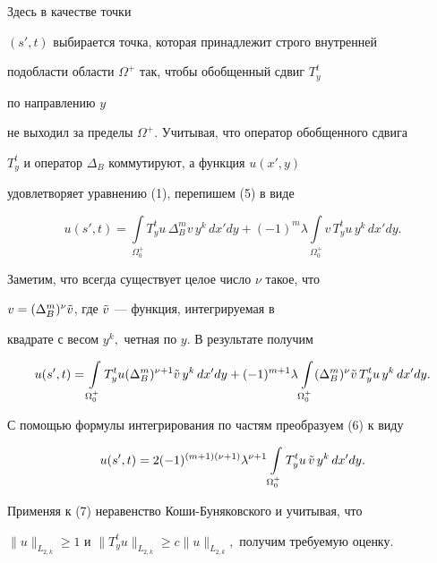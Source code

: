 Здесь в качестве точки


$(s',t)$ выбирается точка, которая принадлежит строго внутренней


подобласти области $\Omega^+$ так, чтобы обобщенный сдвиг $T^t_y$


по направлению $y$


не выходил за пределы $\Omega^+$. Учитывая, что оператор обобщенного сдвига


$T^t_y$ и оператор $\Delta_B$ коммутируют, а функция $u(x',y)$


удовлетворяет уравнению (1), перепишем (5) в виде


$$


u(s',t)=\int\limits_{\Omega^+_0}T^t_yu\,\Delta^m_Bv\,y^k\,dx'dy


+(-1)^m\lambda\int\limits_{\Omega^+_0}v\,T^t_yu\,y^k\,dx'dy.


$$





Заметим, что всегда существует целое число $\nu$ такое, что


$v=(\Delta^m_B)^\nu\Tilde v$, где $\Tilde v$ --- функция, интегрируемая в


квадрате с весом $y^k,$ четная по $y$. В результате получим


\begin{equation}


u(s',t)=\int\limits_{\Omega^+_0}T^t_yu(\Delta^m_B)^{\nu+1}\Tilde


v\,y^k\,dx'dy+(-1)^{m+1}\lambda\int\limits_{\Omega^+_0}(\Delta^m_B)^\nu


\Tilde v\,T^t_yu\,y^k\,dx'dy.


\end{equation}


С помощью формулы интегрирования по частям преобразуем (6) к виду


\begin{equation}


u(s',t)=2(-1)^{(m+1)(\nu+1)}\lambda^{\nu+1}


\int\limits_{\Omega^+_0}T^t_yu\,\Tilde v\,y^k\,dx'dy.


\end{equation}


Применяя к (7) неравенство Коши-Буняковского и учитывая, что


$\|u\|_{L_{2,k}}\ge 1$ и $\|T_y^tu\|_{L_{2,k}}


\ge c\|u\|_{L_{2,k}},$ получим требуемую оценку.


